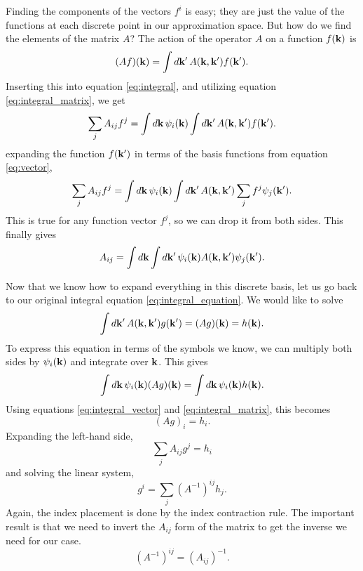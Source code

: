 \documentclass[12pt]{article}
\begin{document}
Finding the components of the vectors $f^i$ is easy; they are just the value of the functions at
each discrete point in our approximation space. But how do we find the elements of the matrix $A$?
The action of the operator $A$ on a function $f(\vb{k})$ is
\begin{equation}
    (Af)(\vb{k}) = \int\dd{\vb{k'}} A(\vb{k}, \vb{k'}) f(\vb{k'}).
\end{equation}
Inserting this into equation \eqref{eq:integral}, and utilizing equation \eqref{eq:integral_matrix},
we get
\begin{equation}
    \sum_j A_{ij} f^j = \int\dd{\vb{k}} \psi_i(\vb{k}) \int\dd{\vb{k'}} A(\vb{k}, \vb{k'}) f(\vb{k'}).
\end{equation}
expanding the function $f(\vb{k'})$ in terms of the basis functions from equation \eqref{eq:vector},
\begin{equation}
    \sum_j A_{ij} f^j = \int\dd{\vb{k}} \psi_i(\vb{k}) \int\dd{\vb{k'}} A(\vb{k}, \vb{k'})
    \sum_j f^j \psi_j(\vb{k'}).
\end{equation}
This is true for any function vector $f^j$, so we can drop it from both sides. This finally gives
\begin{equation}
    A_{ij} = \int\dd{\vb{k}} \int\dd{\vb{k'}} \psi_i(\vb{k}) A(\vb{k}, \vb{k'}) \psi_j(\vb{k'}).
    \label{eq:matrix_elements}
\end{equation}

Now that we know how to expand everything in this discrete basis, let us go back to our original
integral equation \eqref{eq:integral_equation}. We would like to solve
\begin{equation}
    \int \dd{\vb{k'}} A(\vb{k}, \vb{k'}) g(\vb{k'}) = (Ag)(\vb{k}) = h(\vb{k}).
\end{equation}
To express this equation in terms of the symbols we know, we can multiply both sides by
$\psi_i(\vb{k})$ and integrate over $\vb{k}$. This gives
\begin{equation}
    \int \dd{\vb{k}} \psi_i(\vb{k}) (Ag)(\vb{k}) = \int \dd{\vb{k}} \psi_i(\vb{k}) h(\vb{k}).
\end{equation}
Using equations \eqref{eq:integral_vector} and \eqref{eq:integral_matrix}, this becomes
\begin{equation}
    (Ag)_i = h_i.
\end{equation}
Expanding the left-hand side,
\begin{equation}
    \sum_j A_{ij} g^j = h_i
\end{equation}
and solving the linear system,
\begin{equation}
    g^i = \sum_j (A^{-1})^{ij} h_j.
    \label{eq:inverse}
\end{equation}
Again, the index placement is done by the index contraction rule. The important result is that
we need to invert the $A_{ij}$ form of the matrix to get the inverse we need for our case.
\begin{equation}
    (A^{-1})^{ij} = (A_{ij})^{-1}.
\end{equation}
\end{document}
